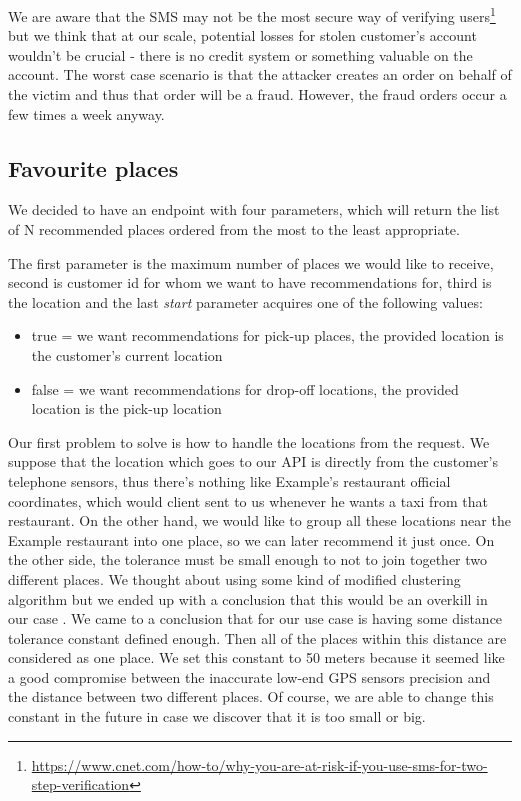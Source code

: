  We are aware that the SMS may not be the most secure way of verifying users\footnote{\url{https://www.cnet.com/how-to/why-you-are-at-risk-if-you-use-sms-for-two-step-verification}} but we think that at our scale, potential losses for stolen customer's account wouldn't be crucial - there is no credit system or something valuable on the account. The worst case scenario is that the attacker creates an order on behalf of the victim and thus that order will be a fraud. However, the fraud orders occur a few times a week anyway.
 
 \subsection{Favourite places}
 We decided to have an endpoint with four parameters, which will return the list of N recommended places ordered from the most to the least appropriate.
 
 The first parameter is the maximum number of places we would like to receive, second is customer id for whom we want to have recommendations for, third is the location and the last \textit{start} parameter acquires one of the following values:
 \begin{itemize}
 	\item true = we want recommendations for pick-up places, the provided location is the customer's current location
 	\item false = we want recommendations for drop-off locations, the provided location is the pick-up location
 \end{itemize}
 
 Our first problem to solve is how to handle the locations from the request. We suppose that the location which goes to our API is directly from the customer's telephone sensors, thus there's nothing like Example's restaurant official coordinates, which would client sent to us whenever he wants a taxi from that restaurant. On the other hand, we would like to group all these locations near the Example restaurant into one place, so we can later recommend it just once. On the other side, the tolerance must be small enough to not to join together two different places. We thought about using some kind of modified clustering algorithm but we ended up with a conclusion that this would be an overkill in our case . We came to a conclusion that for our use case is having some distance tolerance constant defined enough. Then all of the places within this distance are considered as one place. We set this constant to 50 meters because it seemed like a good compromise between the inaccurate low-end GPS sensors precision and the distance between two different places. Of course, we are able to change this constant in the future in case we discover that it is too small or big.
 
